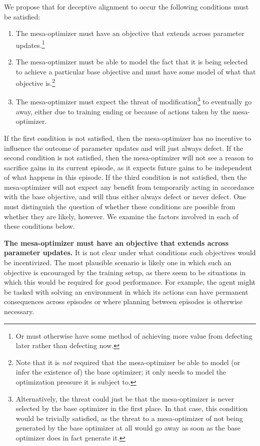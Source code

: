 \documentclass[
  onecolumn,
  natbib,
]{miri-tech-article}
\begin{document}
We propose that for deceptive alignment to occur the following conditions must be satisfied:
\begin{enumerate}
\item The mesa-optimizer must have an objective that extends across parameter updates.\footnote{Or must otherwise have some method of achieving more value from defecting later rather than defecting now.}
\item The mesa-optimizer must be able to model the fact that it is being selected to achieve a particular base objective and must have some model of what that objective is.\footnote{Note that it is \textit{not} required that the mesa-optimizer be able to model (or infer the existence of) the base optimizer; it only needs to model the optimization pressure it is subject to. }
\item The mesa-optimizer must expect the threat of modification\footnote{Alternatively, the threat could just be that the mesa-optimizer is never selected by the base optimizer in the first place. In that case, this condition would be trivially satisfied, as the threat to a mesa-optimizer of not being generated by the base optimizer at all would go away as soon as the base optimizer does in fact generate it.} to eventually go away, either due to training ending or because of actions taken by the mesa-optimizer.
\end{enumerate}
If the first condition is not satisfied, then the mesa-optimizer has no incentive to influence the outcome of parameter updates and will just always defect. If the second condition is not satisfied, then the mesa-optimizer will not see a reason to sacrifice gains in its current episode, as it expects future gains to be independent of what happens in this episode. If the third condition is not satisfied, then the mesa-optimizer will not expect any benefit from temporarily acting in accordance with the base objective, and will thus either always defect or never defect. One must distinguish the question of whether these conditions are possible from whether they are likely, however. We examine the factors involved in each of these conditions below.

\textbf{The mesa-optimizer must have an objective that extends across parameter updates.} It is not clear under what conditions such objectives would be incentivized. The most plausible scenario is likely one in which such an objective is encouraged by the training setup, as there seem to be situations in which this would be required for good performance. For example, the agent might be tasked with solving an environment in which its actions can have permanent consequences across episodes or where planning between episodes is otherwise necessary.
\end{document}
